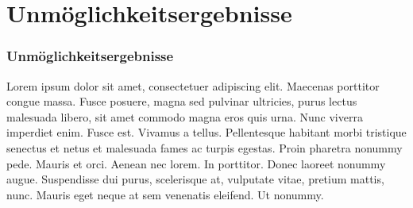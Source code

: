\section{Unmöglichkeitsergebnisse}

\begin{frame}
	\frametitle{Unmöglichkeitsergebnisse}
	Lorem ipsum dolor sit amet, consectetuer adipiscing elit. Maecenas porttitor congue massa. Fusce posuere, magna sed pulvinar ultricies, purus lectus malesuada libero, sit amet commodo magna eros quis urna.
	Nunc viverra imperdiet enim. Fusce est. Vivamus a tellus.
	Pellentesque habitant morbi tristique senectus et netus et malesuada fames ac turpis egestas. Proin pharetra nonummy pede. Mauris et orci.
	Aenean nec lorem. In porttitor. Donec laoreet nonummy augue.
	Suspendisse dui purus, scelerisque at, vulputate vitae, pretium mattis, nunc. Mauris eget neque at sem venenatis eleifend. Ut nonummy.      
\end{frame}